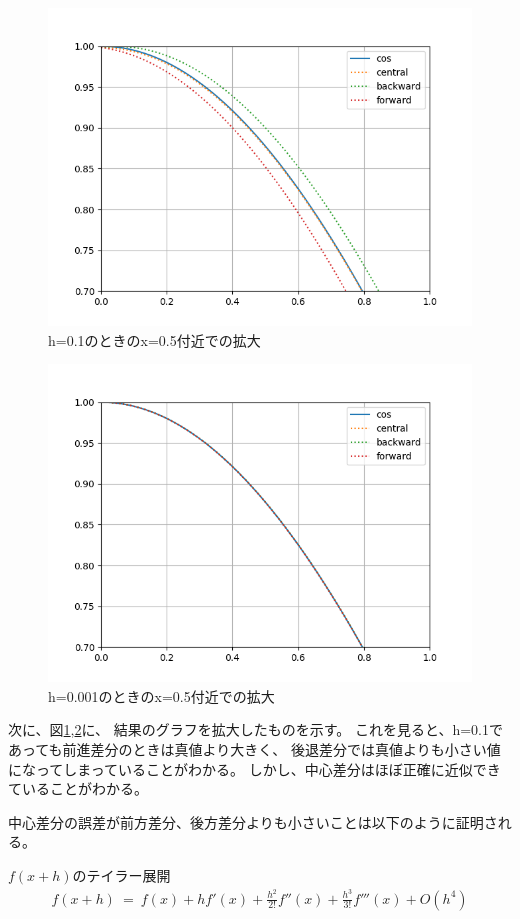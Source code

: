 \documentclass[dvipdfmx]{jsarticle}
\begin{document}
\begin{figure}[H]
  \centering
  \includegraphics[width=0.7\hsize]{../pics/h=0_1_large.png}
  \caption{h=0.1のときのx=0.5付近での拡大}
  \label{fig:h_01_large}
\end{figure}

\begin{figure}[H]
  \centering
  \includegraphics[width=0.7\hsize]{../pics/h=0_001_large.png}
  \caption{h=0.001のときのx=0.5付近での拡大}
  \label{fig:h_0001_large}
\end{figure}

次に、図\ref{fig:h_01_large},\ref{fig:h_0001_large}に、
結果のグラフを拡大したものを示す。
これを見ると、h=0.1であっても前進差分のときは真値より大きく、
後退差分では真値よりも小さい値になってしまっていることがわかる。
しかし、中心差分はほぼ正確に近似できていることがわかる。

中心差分の誤差が前方差分、後方差分よりも小さいことは以下のように証明される。

$f(x+h)のテイラー展開$
\begin{eqnarray}
  f(x+h) ~=~ f(x)+hf'(x)+\frac{h^2}{2!}f''(x)+\frac{h^3}{3!}f'''(x)+O(h^4) \nonumber
\end{eqnarray}
\end{document}
